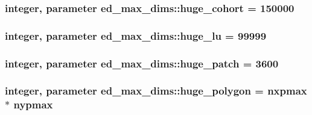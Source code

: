 \subsubsection[{\texorpdfstring{huge\+\_\+cohort}{huge_cohort}}]{\setlength{\rightskip}{0pt plus 5cm}integer, parameter ed\+\_\+max\+\_\+dims\+::huge\+\_\+cohort = 150000}\hypertarget{namespaceed__max__dims_a156b1cc088e31e7dc095c2cf33f775a0}{}\label{namespaceed__max__dims_a156b1cc088e31e7dc095c2cf33f775a0}
\subsubsection[{\texorpdfstring{huge\+\_\+lu}{huge_lu}}]{\setlength{\rightskip}{0pt plus 5cm}integer, parameter ed\+\_\+max\+\_\+dims\+::huge\+\_\+lu = 99999}\hypertarget{namespaceed__max__dims_a02ea3f49de6c06d652845010cf25c58b}{}\label{namespaceed__max__dims_a02ea3f49de6c06d652845010cf25c58b}
\subsubsection[{\texorpdfstring{huge\+\_\+patch}{huge_patch}}]{\setlength{\rightskip}{0pt plus 5cm}integer, parameter ed\+\_\+max\+\_\+dims\+::huge\+\_\+patch = 3600}\hypertarget{namespaceed__max__dims_a968dc04fd98ac746c6750e3540d49535}{}\label{namespaceed__max__dims_a968dc04fd98ac746c6750e3540d49535}
\subsubsection[{\texorpdfstring{huge\+\_\+polygon}{huge_polygon}}]{\setlength{\rightskip}{0pt plus 5cm}integer, parameter ed\+\_\+max\+\_\+dims\+::huge\+\_\+polygon = {\bf nxpmax} $\ast$ {\bf nypmax}}\hypertarget{namespaceed__max__dims_ab29e324be8290f305576594fd41c905a}{}\label{namespaceed__max__dims_ab29e324be8290f305576594fd41c905a}
